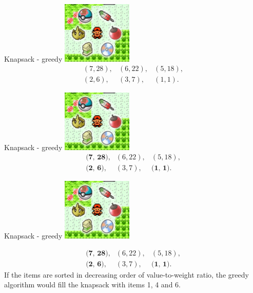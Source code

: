 \documentclass{beamer}
\begin{document}
%

\begin{frame}{Knapsack - greedy}
	\includegraphics[width=0.25\textwidth]{pokeitems.png}
		\[
			\begin{array}{lll}
				(7, 28), & (6, 22), & (5, 18),\\
				(2, 6), & (3, 7), & (1, 1).
			\end{array}
		\]
\end{frame}

%

\begin{frame}{Knapsack - greedy}
	\includegraphics[width=0.25\textwidth]{pokeitems.png}
		\[
			\begin{array}{lll}
				\textbf{(7, 28)}, & (6, 22), & (5, 18),\\
				\textbf{(2, 6)}, & (3, 7), & \textbf{(1, 1)}.
			\end{array}
		\]
\end{frame}

%

\begin{frame}{Knapsack - greedy}
	\includegraphics[width=0.25\textwidth]{pokeitems.png}
	
		\[
			\begin{array}{lll}
				\textbf{(7, 28)}, & (6, 22), & (5, 18),\\
				\textbf{(2, 6)}, & (3, 7), & \textbf{(1, 1)}.
			\end{array}
		\]
	If the items are sorted in decreasing order of
	value-to-weight ratio, the greedy algorithm would fill the knapsack with
	items 1, 4 and 6.
\end{frame}
\end{document}
